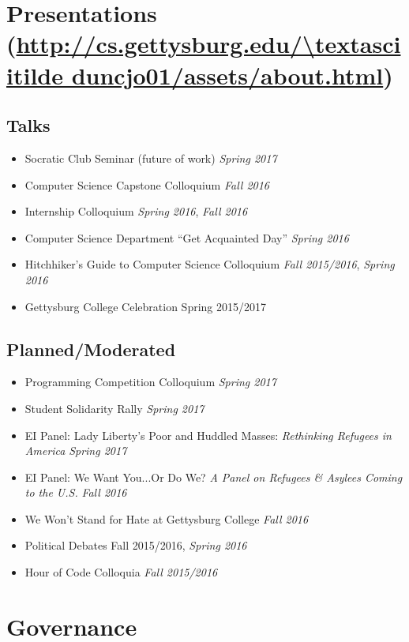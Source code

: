 \documentclass[11pt]{article}
\begin{document}
\section*{Presentations (\url{http://cs.gettysburg.edu/\textasciitilde duncjo01/assets/about.html})}
\subsection*{Talks}
\begin{itemize}[noitemsep]
	\item Socratic Club Seminar (future of work) \hfill \textit{Spring 2017}
	\item Computer Science Capstone Colloquium \hfill \textit{Fall 2016}
	\item Internship Colloquium \hfill \textit{Spring 2016}, \textit{Fall 2016}
	\item Computer Science Department ``Get Acquainted Day'' \hfill \textit{Spring 2016}
	\item Hitchhiker's Guide to Computer Science Colloquium \hfill \textit{Fall 2015/2016}, \textit{Spring 2016}
	\item Gettysburg College Celebration \hfill Spring 2015/2017
\end{itemize}

\subsection*{Planned/Moderated}
\begin{itemize}[noitemsep]
	\item Programming Competition Colloquium \hfill \textit{Spring 2017}
	\item Student Solidarity Rally \hfill \textit{Spring 2017}
	\item EI Panel: Lady Liberty's Poor and Huddled Masses: \textit{Rethinking Refugees in America} \hfill \textit{Spring 2017}
	\item EI Panel: We Want You...Or Do We? \textit{A Panel on Refugees \& Asylees Coming to the U.S.} \hfill \textit{Fall 2016}
	\item We Won't Stand for Hate at Gettysburg College \hfill \textit{Fall 2016}
	\item Political Debates \hfill Fall 2015/2016, \textit{Spring 2016}
	\item Hour of Code Colloquia \hfill \textit{Fall 2015/2016}
\end{itemize}

\section*{Governance}
\end{document}
